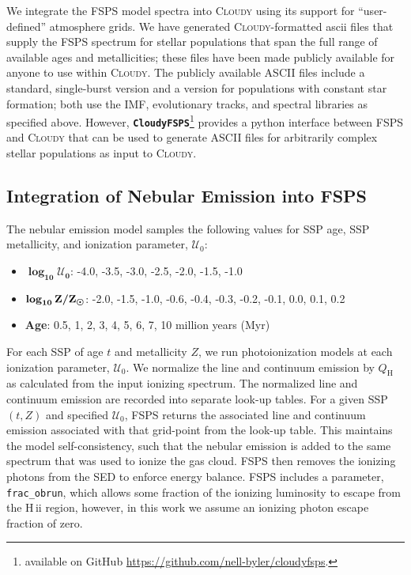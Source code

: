 \documentclass[linenumbers, trackchanges, tighten]{aastex61}%
\newcommand{\FSPS}{{\sc FSPS}\xspace}
\newcommand{\CloudyFSPS}{{\tt \textbf{CloudyFSPS}}\xspace}
\newcommand{\Cloudy}{\textsc{Cloudy}\xspace}
\newcommand{\hii}{H\,{\sc ii}\xspace}
\newcommand{\QH}{\ensuremath{Q_{\mathrm{H}}}}
\newcommand{\U}{\ensuremath{\mathcal{U}_{0}}}
\begin{document}
We integrate the \FSPS model spectra into \Cloudy using its support for ``user-defined'' atmosphere grids. We have generated \Cloudy-formatted ascii files that supply the \FSPS spectrum for stellar populations that span the full range of available ages and metallicities; these files have been made publicly available for anyone to use within \Cloudy. The publicly available ASCII files include a standard, single-burst version and a version for populations with constant star formation; both use the IMF, evolutionary tracks, and spectral libraries as specified above. However, \CloudyFSPS\footnote{available on GitHub \url{https://github.com/nell-byler/cloudyfsps}.} provides a python interface between \FSPS and \Cloudy that can be used to generate ASCII files for arbitrarily complex stellar populations as input to \Cloudy.

\subsection{Integration of Nebular Emission into \FSPS}\label{sec:methods:fsps}

The nebular emission model samples the following values for SSP age, SSP metallicity, and ionization parameter, \U{}:
\begin{itemize}
\item[] $\boldsymbol{\log_{10} \mathcal{U}_0}$: -4.0, -3.5, -3.0, -2.5, -2.0, -1.5, -1.0
\item[] $\boldsymbol{\log_{10} {\rm Z}/{\rm Z}_{\odot}}$: -2.0, -1.5, -1.0, -0.6, -0.4, -0.3, -0.2, -0.1, 0.0, 0.1, 0.2
\item[] {\bf Age}: 0.5, 1, 2, 3, 4, 5, 6, 7, 10 million years (Myr)
\end{itemize}

For each SSP of age $t$ and metallicity $Z$, we run photoionization models at each ionization parameter, \U{}. We normalize the line and continuum emission by \QH{} as calculated from the input ionizing spectrum. The normalized line and continuum emission are recorded into separate look-up tables. For a given SSP $(t, Z)$ and specified \U{}, \FSPS returns the associated line and continuum emission associated with that grid-point from the look-up table. This maintains the model self-consistency, such that the nebular emission is added to the same spectrum that was used to ionize the gas cloud. \FSPS then removes the ionizing photons from the SED to enforce energy balance. \FSPS includes a parameter, {\tt frac\_obrun}, which allows some fraction of the ionizing luminosity to escape from the \hii region, however, in this work we assume an ionizing photon escape fraction of zero.
\end{document}
